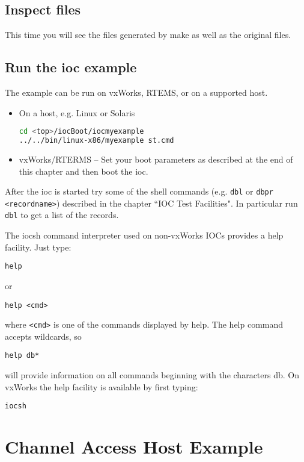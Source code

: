 \subsection{Inspect files}

This time you will see the files generated by make as well as the original files.

\subsection{Run the ioc example}

The example can be run on vxWorks, RTEMS, or on a supported host.

\begin{itemize}
\item On a host, e.g. Linux or Solaris

\begin{lstlisting}[language=sh]
cd <top>/iocBoot/iocmyexample
../../bin/linux-x86/myexample st.cmd
\end{lstlisting}

\item vxWorks/RTERMS -- Set your boot parameters as described at the end of this chapter and then boot the ioc.
\end{itemize}

After the ioc is started try some of the shell commands (e.g. \verb|dbl| or \verb|dbpr <recordname>|) described in the chapter ``IOC 
Test Facilities". In particular run \verb|dbl| to get a list of the records.

The iocsh command interpreter used on non-vxWorks IOCs provides a help facility. Just type:

\begin{verbatim}
help
\end{verbatim}
or
\begin{verbatim}
help <cmd>
\end{verbatim}
where \verb|<cmd>| is one of the commands displayed by help.  The help command accepts wildcards, so
\begin{verbatim}
help db*
\end{verbatim}
will provide information on all commands beginning with the characters db.
On vxWorks the help facility is available by first typing:

\begin{verbatim}
iocsh
\end{verbatim}

\section{Channel Access Host Example}

